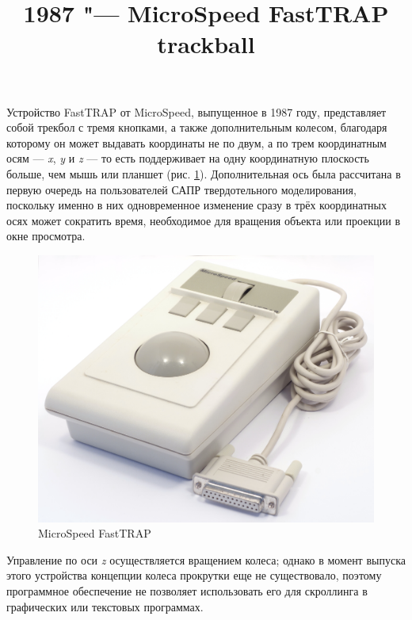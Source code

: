 \documentclass[11pt, a4paper]{article}
\begin{document}
\title{1987 "--- MicroSpeed FastTRAP trackball}
\date{}
\maketitle

Устройство FastTRAP от MicroSpeed, выпущенное в 1987 году, представляет собой трекбол с тремя кнопками, а также дополнительным колесом, благодаря которому он может выдавать координаты не по двум, а по трем координатным осям  — \textit{x}, \textit{y} и \textit{z} — то есть поддерживает на одну координатную плоскость больше, чем мышь или планшет (рис. \ref{fig:FastTRAPPic}). Дополнительная ось была рассчитана в первую очередь на пользователей САПР твердотельного моделирования, поскольку именно в них одновременное изменение сразу в трёх координатных осях может сократить время, необходимое для вращения объекта или проекции в окне просмотра.

\begin{figure}[h]
   \centering
    \includegraphics[scale=0.3]{1987_microspeed_fasttrap/pic_15.jpg}
    \caption{MicroSpeed FastTRAP}
    \label{fig:FastTRAPPic}
\end{figure}

Управление по оси \textit{z} осуществляется вращением колеса; однако в момент выпуска этого устройства концепции колеса прокрутки еще не существовало, поэтому программное обеспечение не позволяет использовать его для скроллинга в графических или текстовых программах.
\end{document}
